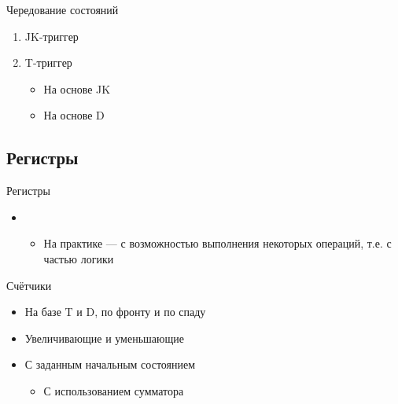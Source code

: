 \documentclass[xetex,aspectratio=43]{beamer}
\begin{document}
\begin{frame}{Чередование состояний}
        \begin{enumerate}
            \tightlist
            \item
            JK-триггер
            \item
            T-триггер

            \begin{itemize}
                \tightlist
                \item
                На основе JK
                \item
                На основе D
            \end{itemize}
        \end{enumerate}

\end{frame}

\subsection{Регистры}

\begin{frame}{Регистры}
    \begin{itemize}
        \tightlist
        \item

        \begin{itemize}
            \item
            На практике --- с возможностью выполнения некоторых операций, т.е. с частью логики
        \end{itemize}
    \end{itemize}
\end{frame}

\begin{frame}{Счётчики}
        \begin{itemize}
            \item
            На базе T и D, по фронту и по спаду
            \item
            Увеличивающие и уменьшающие
            \item
            С заданным начальным состоянием

            \begin{itemize}
                \item
                С использованием сумматора
            \end{itemize}
        \end{itemize}
\end{frame}
\end{document}

